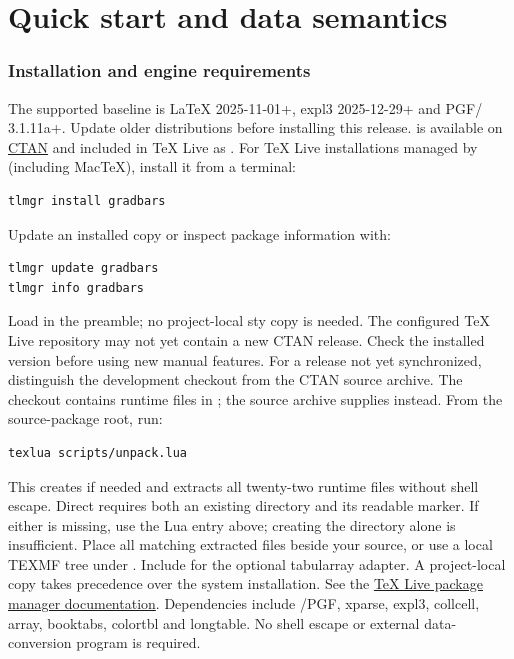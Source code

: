\part{Quick start and data semantics}

\section{Installation and engine requirements}
The supported baseline is LaTeX 2025-11-01+, expl3 2025-12-29+ and
PGF/\manualTikZ{} 3.1.11a+. Update older distributions before installing this release.
 is available on \href{https://ctan.org/pkg/gradbars}{CTAN} and included
in TeX Live as . For TeX Live installations managed by  (including
MacTeX), install it from a terminal:
\begin{lstlisting}[style=gradmanual,language={}]
tlmgr install gradbars
\end{lstlisting}
Update an installed copy or inspect package information with:
\begin{lstlisting}[style=gradmanual,language={}]
tlmgr update gradbars
tlmgr info gradbars
\end{lstlisting}
Load \key{\usepackage{gradbars}} in the preamble; no project-local sty copy is
needed. The configured TeX Live repository may not yet contain a new CTAN
release. Check the installed version before using new manual features.
For a release not yet synchronized, distinguish the development checkout from
the CTAN source archive. The checkout contains runtime files in ;
the source archive supplies  instead. From the source-package root, run:
\begin{lstlisting}[style=gradmanual,language={}]
texlua scripts/unpack.lua
\end{lstlisting}
This creates  if needed and extracts all twenty-two runtime files
without shell escape. Direct  requires both an existing
 directory and its readable  marker. If either is
missing, use the Lua entry above; creating the directory alone is insufficient.
Place all matching extracted  files beside your source, or use a local
TEXMF tree under .
Include  for the optional tabularray adapter.
A project-local copy takes precedence over the system installation. See the
\href{https://tug.org/texlive/doc/tlmgr.html}{TeX Live package manager documentation}.
Dependencies include \manualTikZ{}/PGF, xparse, expl3, collcell, array, booktabs, colortbl and longtable.
No shell escape or external data-conversion program is required.

